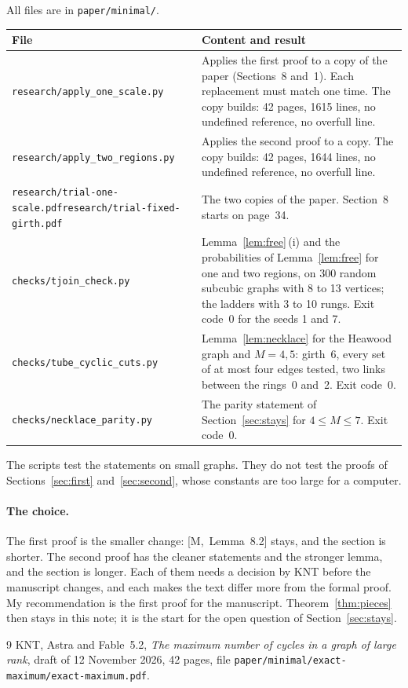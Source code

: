 \documentclass[11pt]{article}
\newcommand{\M}[1]{[M,~#1]}
\begin{document}
All files are in \texttt{paper/minimal/}.
\begin{center}
\small
\begin{tabular}{@{}p{5.6cm}p{8.6cm}@{}}
\toprule
File & Content and result\\
\midrule
\texttt{research/apply\_one\_scale.py} & Applies the first proof to a copy of the paper
(Sections~8 and~1). Each replacement must match one time. The copy builds: 42 pages, 1615
lines, no undefined reference, no overfull line.\\\addlinespace
\texttt{research/apply\_two\_regions.py} & Applies the second proof to a copy. The copy builds:
42 pages, 1644 lines, no undefined reference, no overfull line.\\\addlinespace
\texttt{research/trial-one-scale.pdf}\newline \texttt{research/trial-fixed-girth.pdf} &
The two copies of the paper. Section~8 starts on page~34.\\\addlinespace
\texttt{checks/tjoin\_check.py} & Lemma~\ref{lem:free}\,(i) and the probabilities of
Lemma~\ref{lem:free} for one and two regions, on 300 random subcubic graphs with 8 to 13
vertices; the ladders with 3 to 10 rungs. Exit code~0 for the seeds 1 and 7.\\\addlinespace
\texttt{checks/tube\_cyclic\_cuts.py} & Lemma~\ref{lem:necklace} for the Heawood graph and
$M=4,5$: girth~6, every set of at most four edges tested, two links between the rings~0 and~2.
Exit code~0.\\\addlinespace
\texttt{checks/necklace\_parity.py} & The parity statement of Section~\ref{sec:stays} for
$4\le M\le7$. Exit code~0.\\
\bottomrule
\end{tabular}
\end{center}
The scripts test the statements on small graphs. They do not test the proofs of
Sections~\ref{sec:first} and~\ref{sec:second}, whose constants are too large for a computer.

\paragraph{The choice.} The first proof is the smaller change: \M{Lemma~8.2} stays, and the
section is shorter. The second proof has the cleaner statements and the stronger lemma, and the
section is longer. Each of them needs a decision by KNT before the manuscript changes, and each
makes the text differ more from the formal proof. My recommendation is the first proof for the
manuscript. Theorem~\ref{thm:pieces} then stays in this note; it is the start for the open
question of Section~\ref{sec:stays}.

\begin{thebibliography}{9}\small
{} KNT, Astra and Fable~5.2, \emph{The maximum number of cycles in a graph of large
rank}, draft of 12 November 2026, 42 pages, file
\texttt{paper/minimal/exact-maximum/exact-maximum.pdf}.
\end{thebibliography}
\end{document}
